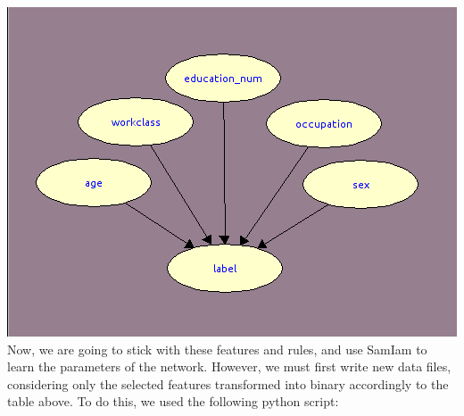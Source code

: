 \documentclass{article}
\begin{document}
\includegraphics[width=.9\linewidth]{./img/bayes_net.png}
\\

Now, we are going to stick with these features and rules, and use SamIam to learn the parameters
of the network. However, we must first write new data files, considering only the selected
features transformed into binary accordingly to the table above. To do this, we used the
following python script:
\end{document}
